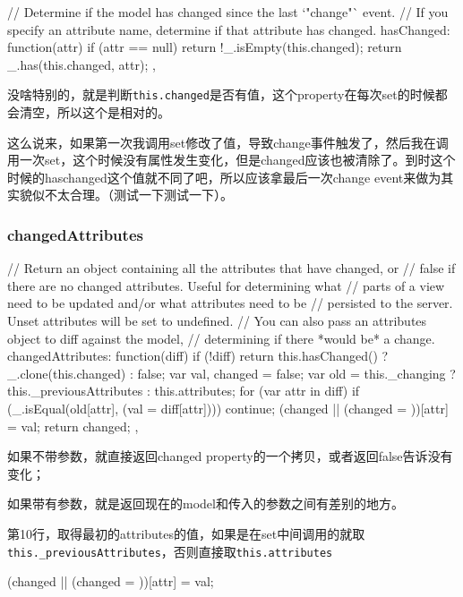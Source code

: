 \begin{JavaScript}
    // Determine if the model has changed since the last `"change"` event.
    // If you specify an attribute name, determine if that attribute has changed.
    hasChanged: function(attr) {
      if (attr == null) return !_.isEmpty(this.changed);
      return _.has(this.changed, attr);
    },
\end{JavaScript}

没啥特别的，就是判断\lstinline$this.changed$是否有值，这个property在每次set的时候都会清空，所以这个是相对的。

这么说来，如果第一次我调用set修改了值，导致change事件触发了，然后我在调用一次set，这个时候没有属性发生变化，但是changed应该也被清除了。到时这个时候的haschanged这个值就不同了吧，所以应该拿最后一次change event来做为其实貌似不太合理。（测试一下测试一下）。

\subsubsection{changedAttributes}

\begin{JavaScript}
    // Return an object containing all the attributes that have changed, or
    // false if there are no changed attributes. Useful for determining what
    // parts of a view need to be updated and/or what attributes need to be
    // persisted to the server. Unset attributes will be set to undefined.
    // You can also pass an attributes object to diff against the model,
    // determining if there *would be* a change.
    changedAttributes: function(diff) {
      if (!diff) return this.hasChanged() ? _.clone(this.changed) : false;
      var val, changed = false;
      var old = this._changing ? this._previousAttributes : this.attributes;
      for (var attr in diff) {
        if (_.isEqual(old[attr], (val = diff[attr]))) continue;
        (changed || (changed = {}))[attr] = val;
      }
      return changed;
    },
\end{JavaScript}

如果不带参数，就直接返回changed property的一个拷贝，或者返回false告诉没有变化；

如果带有参数，就是返回现在的model和传入的参数之间有差别的地方。

第10行，取得最初的attributes的值，如果是在set中间调用的就取\lstinline$this._previousAttributes$，否则直接取\lstinline$this.attributes$

\begin{JavaScript}
(changed || (changed = {}))[attr] = val;
\end{JavaScript}

